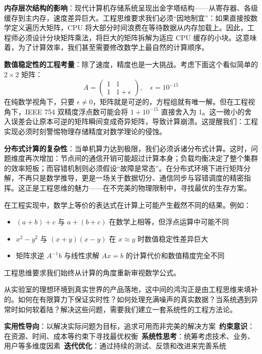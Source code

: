 \textbf{内存层次结构的影响}：现代计算机存储系统呈现出金字塔结构——从寄存器、各级缓存到主内存，速度差异巨大。工程思维要求我们必须“因地制宜”：如果直接按数学定义遍历大矩阵，CPU 将大部分时间浪费在等待数据从内存加载上。因此，工程师必须设计分块矩阵乘法，将巨大的矩阵拆解为适应 CPU 缓存的小块。这意味着，为了计算效率，我们甚至需要修改数学上最自然的计算顺序。

\textbf{数值稳定性的工程考量}：除了速度，精度也是一大挑战。考虑下面这个看似简单的 $2 \times 2$ 矩阵：
$$
A = \begin{pmatrix} 1 & 1 \\ 1 & 1+\epsilon \end{pmatrix}, \quad \epsilon = 10^{-15}
$$
在纯数学视角下，只要 $\epsilon \neq 0$，矩阵就是可逆的，方程组就有唯一解。但在工程视角下，IEEE 754 双精度浮点数可能会将 $1 + 10^{-15}$ 直接舍入为 1。这一微小的舍入误差会让原本可逆的矩阵瞬间变成奇异矩阵，导致计算崩溃。这提醒我们：工程实现必须时刻警惕物理存储精度对数学理论的侵蚀。

\textbf{分布式计算的复杂性}：当单机算力达到极限，我们必须诉诸分布式计算。这时，问题维度再次增加：节点间的通信开销可能超过计算本身；负载均衡决定了整个集群的效率短板；而容错机制则必须假设“故障是常态”。在分布式环境下进行矩阵分解，不再只是数学推导，更是一场关于数据切分、通信同步与容错调度的精密指挥。这正是工程思维的魅力——在不完美的物理限制中，寻找最优的生存方案。

\begin{tcolorbox}[colback=red!5!white,colframe=red!75!black,title=警示：
  数学等价 $\neq$ 计算等价]
在工程实现中，数学上等价的表达式在计算上可能产生截然不同的结果。例如：
\begin{itemize}
\item $(a+b)+c$ 与 $a+(b+c)$ 在数学上相等，但浮点运算中可能不同
\item $x^2-y^2$ 与 $(x+y)(x-y)$ 在 $x \approx y$ 时数值稳定性差异巨大
\item 矩阵求逆 $A^{-1}b$ 与线性求解 $Ax=b$ 的计算代价和数值精度完全不同
\end{itemize}
工程思维要求我们始终从计算的角度重新审视数学公式。
\end{tcolorbox}

从实验室的理想环境到真实世界的产品落地，这中间的鸿沟正是由工程思维来填补的。如何在有限算力下保证实时性？如何处理充满噪声的真实数据？当系统遇到异常时如何软着陆？解决这些问题，需要我们建立一套系统性的工程方法论。

\begin{tcolorbox}[colback=orange!5!white,colframe=orange!75!black,title=核心概念：工程思维的四大支柱] 
  \textbf{实用性导向}：以解决实际问题为目标，追求可用而非完美的解决方案\ 
  \textbf{约束意识}：在资源、时间、成本等约束下寻找最优权衡\ 
  \textbf{系统性思考}：统筹考虑技术、业务、用户等多维度因素\ 
  \textbf{迭代优化}：通过持续的测试、反馈和改进来完善系统 
\end{tcolorbox}

